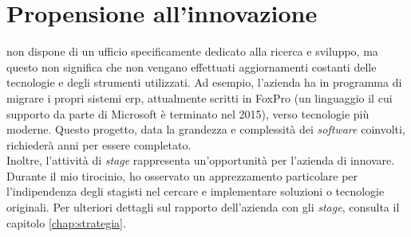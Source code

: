 \section{Propensione all'innovazione}\label{chap:Propensione all'innovazione}
{\company} non dispone di un ufficio specificamente dedicato alla ricerca e sviluppo, ma questo non significa che non 
vengano effettuati aggiornamenti costanti delle tecnologie e degli strumenti utilizzati. Ad esempio, l'azienda ha 
in programma di migrare i propri sistemi \gls{erp}, attualmente scritti in FoxPro (un linguaggio il cui supporto da 
parte di Microsoft è terminato nel 2015), verso tecnologie più moderne. Questo progetto, data la grandezza e 
complessità dei \textit{software} coinvolti, richiederà anni per essere completato.\\
Inoltre, l'attività di \textit{stage} rappresenta un'opportunità per l'azienda di innovare. Durante il mio tirocinio, 
ho osservato un apprezzamento particolare per l'indipendenza degli stagisti nel cercare e implementare 
soluzioni o tecnologie originali. Per ulteriori dettagli sul rapporto dell'azienda con gli \textit{stage}, consulta il 
capitolo \ref{chap:strategia}.
